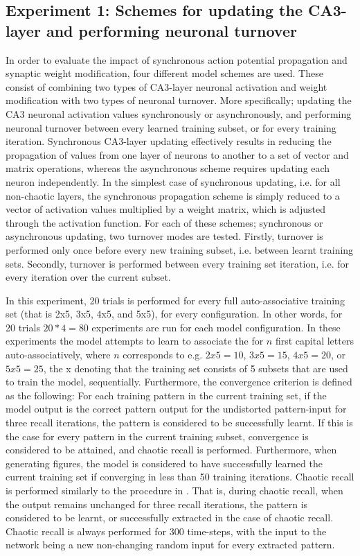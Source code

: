 \subsection{Experiment 1: Schemes for updating the CA3-layer and performing neuronal turnover}

In order to evaluate the impact of synchronous action potential propagation and synaptic weight modification, four different model schemes are used. These consist of combining two types of CA3-layer neuronal activation and weight modification with two types of neuronal turnover. More specifically; updating the CA3 neuronal activation values synchronously or asynchronously, and performing neuronal turnover between every learned training subset, or for every training iteration. Synchronous CA3-layer updating effectively results in reducing the propagation of values from one layer of neurons to another to a set of vector and matrix operations, whereas the asynchronous scheme requires updating each neuron independently. In the simplest case of synchronous updating, i.e. for all non-chaotic layers, the synchronous propagation scheme is simply reduced to a vector of activation values multiplied by a weight matrix, which is adjusted through the activation function. For each of these schemes; synchronous or asynchronous updating, two turnover modes are tested. Firstly, turnover is performed only once before every new training subset, i.e. between learnt training sets. Secondly, turnover is performed between every training set iteration, i.e. for every iteration over the current subset.

In this experiment, 20 trials is performed for every full auto-associative training set (that is 2x5, 3x5, 4x5, and 5x5), for every configuration. In other words, for 20 trials $20 * 4 = 80$ experiments are run for each model configuration. In these experiments the model attempts to learn to associate the for $n$ first capital letters auto-associatively, where $n$ corresponds to e.g. $2x5 = 10$, $3x5=15$, $4x5=20$, or $5x5=25$, the x denoting that the training set consists of 5 subsets that are used to train the model, sequentially. 
Furthermore, the convergence criterion is defined as the following: For each training pattern in the current training set, if the model output is the correct pattern output for the undistorted pattern-input for three recall iterations, the pattern is considered to be successfully learnt. If this is the case for every pattern in the current training subset, convergence is considered to be attained, and chaotic recall is performed. Furthermore, when generating figures, the model is considered to have successfully learned the current training set if converging in less than 50 training iterations. Chaotic recall is performed similarly to the procedure in \citep{Hattori2010, Hattori2014}. That is, during chaotic recall, when the output remains unchanged for three recall iterations, the pattern is considered to be learnt, or successfully extracted in the case of chaotic recall. Chaotic recall is always performed for 300 time-steps, with the input to the network being a new non-changing random input for every extracted pattern.

